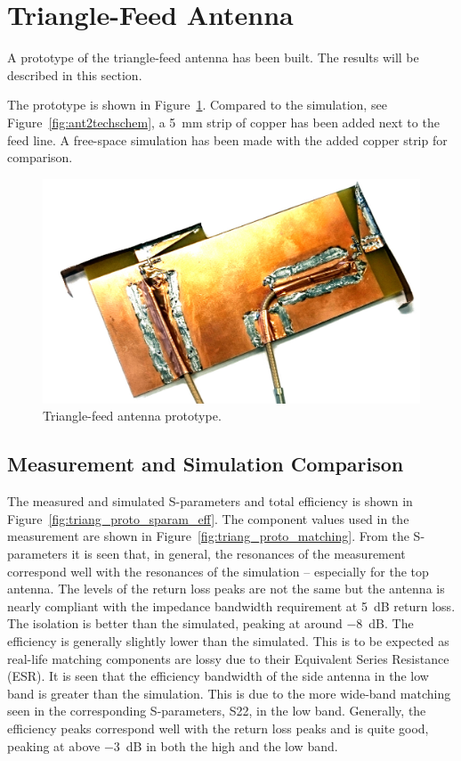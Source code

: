 \section{Triangle-Feed Antenna}
\label{sec:triang_proto}
A prototype of the triangle-feed antenna has been built. The results will be described in this section.

The prototype is shown in Figure~\ref{fig:triang_proto}. Compared to the simulation, see Figure~\ref{fig:ant2techschem}, a \SI{5}{mm} strip of copper has been added next to the feed line. A free-space simulation has been made with the added copper strip for comparison.

\begin{figure}[htbp]
    \centering
    \includegraphics{img/tech_sol/trianglefeed/mockup/mockup.jpg}
    \caption{Triangle-feed antenna prototype.}
    \label{fig:triang_proto}
\end{figure}

\subsection{Measurement and Simulation Comparison}
The measured and simulated S-parameters and total efficiency is shown in Figure~\ref{fig:triang_proto_sparam_eff}. The component values used in the measurement are shown in Figure~\ref{fig:triang_proto_matching}. From the S-parameters it is seen that, in general, the resonances of the measurement correspond well with the resonances of the simulation -- especially for the top antenna. The levels of the return loss peaks are not the same but the antenna is nearly compliant with the impedance bandwidth requirement at \SI{5}{dB} return loss. The isolation is better than the simulated, peaking at around \SI{-8}{dB}. The efficiency is generally slightly lower than the simulated. This is to be expected as real-life matching components are lossy due to their Equivalent Series Resistance (ESR). It is seen that the efficiency bandwidth of the side antenna in the low band is greater than the simulation. This is due to the more wide-band matching seen in the corresponding S-parameters, S22, in the low band. Generally, the efficiency peaks correspond well with the return loss peaks and is quite good, peaking at above \SI{-3}{dB} in both the high and the low band.


